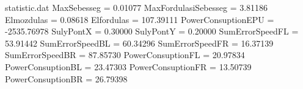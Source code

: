 \begin{filecontents}{statistic.dat}
MaxSebesseg = 0.01077
MaxFordulasiSebesseg = 3.81186
Elmozdulas = 0.08618
Elfordulas = 107.39111
PowerConsuptionEPU = -2535.76978
SulyPontX = 0.30000
SulyPontY = 0.20000
SumErrorSpeedFL = 53.91442
SumErrorSpeedBL = 60.34296
SumErrorSpeedFR = 16.37139
SumErrorSpeedBR = 87.85730
PowerConsuptionFL = 20.97834
PowerConsuptionBL = 23.47303
PowerConsuptionFR = 13.50739
PowerConsuptionBR = 26.79398
\end{filecontents}
